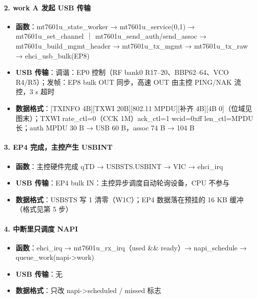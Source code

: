 \paragraph*{2. work A 发起 USB 传输}
\begin{itemize}[leftmargin=2em,itemsep=1pt]
\item \textbf{函数}：mt7601u\_state\_worker → mt7601u\_service(0,1) → mt7601u\_set\_channel ｜ mt7601u\_send\_auth/send\_assoc → mt7601u\_build\_mgmt\_header → mt7601u\_tx\_mgmt → mt7601u\_tx\_raw → ehci\_usb\_bulk(EP8)
\item \textbf{USB 传输}：调谐：EP0 控制（RF bank0 R17–20、BBP62–64、VCO R4/R5）；发帧：EP8 bulk OUT 同步，高速 OUT 由主控 PING/NAK 流控，3 s 超时
\item \textbf{数据格式}：[TXINFO 4B][TXWI 20B][802.11 MPDU][补齐 4B][4B 0]（位域见图末）；TXWI rate\_ctl=0（CCK 1M）ack\_ctl=1 wcid=0xff len\_ctl=MPDU 长；auth MPDU 30 B → USB 60 B，assoc 74 B → 104 B
\end{itemize}

\paragraph*{3. EP4 完成，主控产生 USBINT}
\begin{itemize}[leftmargin=2em,itemsep=1pt]
\item \textbf{函数}：主控硬件完成 qTD → USBSTS.USBINT → VIC → ehci\_irq
\item \textbf{USB 传输}：EP4 bulk IN：主控异步调度自动轮询设备，CPU 不参与
\item \textbf{数据格式}：USBSTS 写 1 清零（W1C）；EP4 数据落在预挂的 16 KB 缓冲（格式见第 5 步）
\end{itemize}

\paragraph*{4. 中断里只调度 NAPI}
\begin{itemize}[leftmargin=2em,itemsep=1pt]
\item \textbf{函数}：ehci\_irq → mt7601u\_rx\_irq（used \&\& ready）→ napi\_schedule → queue\_work(napi->work)
\item \textbf{USB 传输}：无
\item \textbf{数据格式}：只改 napi->scheduled / missed 标志
\end{itemize}

